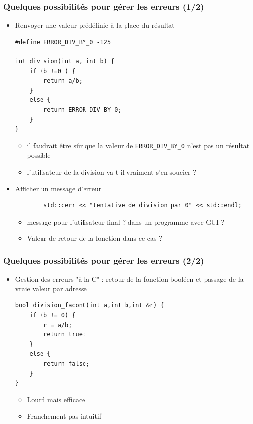 \begin{frame}[fragile]
\frametitle{Quelques possibilités pour gérer les erreurs (1/2)}
\begin{itemize}
\item Renvoyer une valeur prédéfinie à la place du résultat
\begin{lstlisting}
#define ERROR_DIV_BY_0 -125

int division(int a, int b) {
    if (b !=0 ) {
        return a/b;
    }
    else {
        return ERROR_DIV_BY_0;
    }
}
\end{lstlisting}
\begin{itemize}
\item il faudrait être sûr que la valeur de \verb|ERROR_DIV_BY_0| n'est pas un résultat possible
\item l'utilisateur de la division va-t-il vraiment s'en soucier ?
\end{itemize}
\item Afficher un message d'erreur
\begin{lstlisting}
        std::cerr << "tentative de division par 0" << std::endl;
\end{lstlisting}
\begin{itemize}
\item message pour l'utilisateur final ? dans un programme avec GUI ?
\item Valeur de retour de la fonction dans ce cas ?
\end{itemize}
\end{itemize}
\end{frame}

\begin{frame}[fragile]
\frametitle{Quelques possibilités pour gérer les erreurs (2/2)}
\begin{itemize}
\item Gestion des erreurs "à la C" : retour de la fonction booléen et passage de la vraie valeur par adresse
\begin{lstlisting}
bool division_faconC(int a,int b,int &r) {
    if (b != 0) {
        r = a/b;
        return true;
    }
    else {
        return false;
    }
}
\end{lstlisting}
\begin{itemize}
\item Lourd mais efficace
\item Franchement pas intuitif
\end{itemize}
\end{itemize}
\end{frame}

